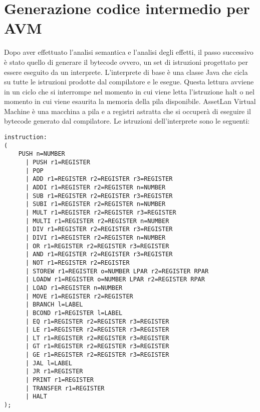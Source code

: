\documentclass[12pt,twoside,openright,a4paper]{report}
\begin{document}
\chapter{Generazione codice intermedio per AVM}
Dopo aver effettuato l'analisi semantica e l'analisi degli effetti, il passo successivo è stato quello di generare il bytecode ovvero, un set di istruzioni progettato per essere eseguito da un interprete. \newline
L’interprete di base è una classe Java che cicla su tutte le istruzioni prodotte dal compilatore e le esegue. Questa lettura avviene in un ciclo che si interrompe nel momento in cui viene letta l’istruzione halt o nel momento in cui viene esaurita la memoria della pila disponibile.  \newline
AssetLan Virtual Machine è una macchina a pila e a registri astratta che si occuperà di eseguire il bytecode generato dal compilatore.
\newline
Le istruzioni dell'interprete sono le seguenti:
\begin{lstlisting}
instruction:
(
    PUSH n=NUMBER
	  | PUSH r1=REGISTER
	  | POP
	  | ADD r1=REGISTER r2=REGISTER r3=REGISTER
	  | ADDI r1=REGISTER r2=REGISTER n=NUMBER
	  | SUB r1=REGISTER r2=REGISTER r3=REGISTER
	  | SUBI r1=REGISTER r2=REGISTER n=NUMBER
	  | MULT r1=REGISTER r2=REGISTER r3=REGISTER
	  | MULTI r1=REGISTER r2=REGISTER n=NUMBER
	  | DIV r1=REGISTER r2=REGISTER r3=REGISTER
	  | DIVI r1=REGISTER r2=REGISTER n=NUMBER
	  | OR r1=REGISTER r2=REGISTER r3=REGISTER
	  | AND r1=REGISTER r2=REGISTER r3=REGISTER
	  | NOT r1=REGISTER r2=REGISTER
	  | STOREW r1=REGISTER o=NUMBER LPAR r2=REGISTER RPAR
	  | LOADW r1=REGISTER o=NUMBER LPAR r2=REGISTER RPAR
	  | LOAD r1=REGISTER n=NUMBER
	  | MOVE r1=REGISTER r2=REGISTER
	  | BRANCH l=LABEL
	  | BCOND r1=REGISTER l=LABEL
	  | EQ r1=REGISTER r2=REGISTER r3=REGISTER
	  | LE r1=REGISTER r2=REGISTER r3=REGISTER
	  | LT r1=REGISTER r2=REGISTER r3=REGISTER
	  | GT r1=REGISTER r2=REGISTER r3=REGISTER
      | GE r1=REGISTER r2=REGISTER r3=REGISTER
      | JAL l=LABEL
      | JR r1=REGISTER
	  | PRINT r1=REGISTER
	  | TRANSFER r1=REGISTER
	  | HALT
);
\end{lstlisting}
\end{document}
